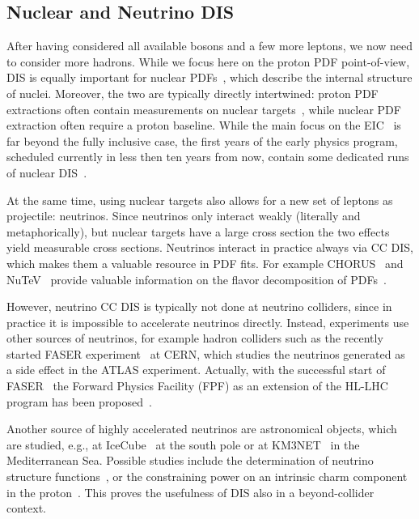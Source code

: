 \subsection{Nuclear and Neutrino DIS}
\label{sec:nuclearneutrino}

After having considered all available bosons and a few more leptons, we now need to consider more hadrons.
While we focus here on the proton PDF point-of-view, DIS is equally important for nuclear PDFs~\cite{Eskola:2021nhw,AbdulKhalek:2022fyi,Klasen:2025ekj,Helenius:2021tof}, which describe the internal structure of nuclei.
Moreover, the two are typically directly intertwined: proton PDF extractions often contain measurements on nuclear targets~\cite{NNPDF:2021njg}, while nuclear PDF extraction often require a proton baseline.
While the main focus on the EIC~\cite{AbdulKhalek:2022fyi} is far beyond the fully inclusive case, the first years of the early physics program, scheduled currently in less then ten years from now, contain some dedicated runs of nuclear DIS~\cite{Abbott:2026eqp}.


At the same time, using nuclear targets also allows for a new set of leptons as projectile: neutrinos.
Since neutrinos only interact weakly (literally and metaphorically), but nuclear targets have a large cross section the two effects yield measurable cross sections.
Neutrinos interact in practice always via CC DIS, which makes them a valuable resource in PDF fits.
For example CHORUS~\cite{CHORUS:2005cpn} and NuTeV~\cite{NuTeV:2001dfo,Mason:2006qa} provide valuable information on the flavor decomposition of PDFs~\cite{Helenius:2026uuz}.

However, neutrino CC DIS is typically not done at neutrino colliders, since in practice it is impossible to accelerate neutrinos directly.
Instead, experiments use other sources of neutrinos, for example hadron colliders such as the recently started FASER experiment~\cite{FASER:2022hcn} at CERN, which studies the neutrinos generated as a side effect in the ATLAS experiment.
Actually, with the successful start of FASER~\cite{Hayakawa:2025xra} the Forward Physics Facility (FPF) as an extension of the HL-LHC program has been proposed~\cite{FPF:2025bor}.

Another source of highly accelerated neutrinos are astronomical objects, which are studied, e.g., at IceCube~\cite{IceCube:2013low} at the south pole or at KM3NET~\cite{KM3Net:2016zxf} in the Mediterranean Sea.
Possible studies include the determination of neutrino structure functions~\cite{Candido:2023utz}, or the constraining power on an intrinsic charm component in the proton~\cite{Das:2025snq}.
This proves the usefulness of DIS also in a beyond-collider context.

